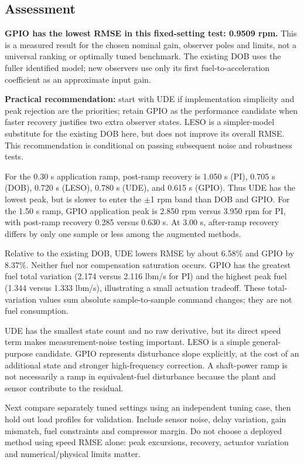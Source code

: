 \subsection{Assessment}

\textbf{GPIO has the lowest RMSE in this fixed-setting test: 0.9509 rpm.} This is a measured result for the chosen nominal gain, observer poles and limits, not a universal ranking or optimally tuned benchmark. The existing DOB uses the fuller identified model; new observers use only its first fuel-to-acceleration coefficient as an approximate input gain.

\textbf{Practical recommendation:} start with UDE if implementation simplicity and peak rejection are the priorities; retain GPIO as the performance candidate when faster recovery justifies two extra observer states. LESO is a simpler-model substitute for the existing DOB here, but does not improve its overall RMSE. This recommendation is conditional on passing subsequent noise and robustness tests.

For the 0.30 s application ramp, post-ramp recovery is 1.050 s (PI), 0.705 s (DOB), 0.720 s (LESO), 0.780 s (UDE), and 0.615 s (GPIO). Thus UDE has the lowest peak, but is slower to enter the $\pm$1 rpm band than DOB and GPIO. For the 1.50 s ramp, GPIO application peak is 2.850 rpm versus 3.950 rpm for PI, with post-ramp recovery 0.285 versus 0.630 s. At 3.00 s, after-ramp recovery differs by only one sample or less among the augmented methods.

Relative to the existing DOB, UDE lowers RMSE by about 6.58\% and GPIO by 8.37\%. Neither fuel nor compensation saturation occurs. GPIO has the greatest fuel total variation (2.174 versus 2.116 lbm/s for PI) and the highest peak fuel (1.344 versus 1.333 lbm/s), illustrating a small actuation tradeoff. These total-variation values sum absolute sample-to-sample command changes; they are not fuel consumption.

UDE has the smallest state count and no raw derivative, but its direct speed term makes measurement-noise testing important. LESO is a simple general-purpose candidate. GPIO represents disturbance slope explicitly, at the cost of an additional state and stronger high-frequency correction. A shaft-power ramp is not necessarily a ramp in equivalent-fuel disturbance because the plant and sensor contribute to the residual.

Next compare separately tuned settings using an independent tuning case, then hold out load profiles for validation. Include sensor noise, delay variation, gain mismatch, fuel constraints and compressor margin. Do not choose a deployed method using speed RMSE alone: peak excursions, recovery, actuator variation and numerical/physical limits matter.


